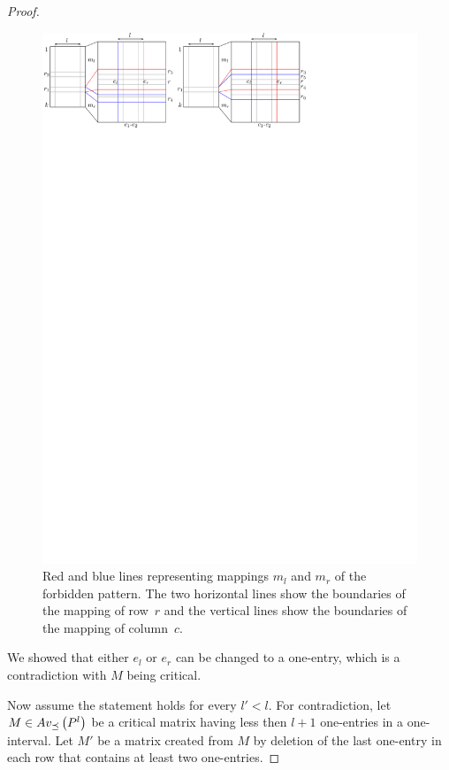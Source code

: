 \begin{proof}
\begin{figure}[!ht]
\centering
\includegraphics[width=\textwidth]{img/emptymidcol.pdf}
\caption{Red and blue lines representing mappings $m_l$ and $m_r$ of the forbidden pattern. The two horizontal lines show the boundaries of the mapping of row~$r$ and the vertical lines show the boundaries of the mapping of column~$c$.}
\label{fig:emptymid}
\end{figure}
We showed that either $e_l$ or $e_r$ can be changed to a one-entry, which is a contradiction with $M$ being critical.

Now assume the statement holds for every $l'<l$. For contradiction, let $M\in Av_{\preceq}\left(P^l\right)$ be a critical matrix having less then $l+1$ one-entries in a one-interval. Let $M'$ be a matrix created from $M$ by deletion of the last one-entry in each row that contains at least two one-entries.


\end{proof}

